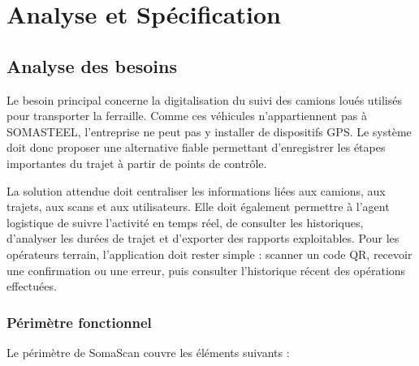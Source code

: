 \chapter{Analyse et Spécification}



\section{Analyse des besoins}

Le besoin principal concerne la digitalisation du suivi des camions loués utilisés pour transporter la ferraille. Comme ces véhicules n'appartiennent pas à SOMASTEEL, l'entreprise ne peut pas y installer de dispositifs GPS. Le système doit donc proposer une alternative fiable permettant d'enregistrer les étapes importantes du trajet à partir de points de contrôle.

La solution attendue doit centraliser les informations liées aux camions, aux trajets, aux scans et aux utilisateurs. Elle doit également permettre à l'agent logistique de suivre l'activité en temps réel, de consulter les historiques, d'analyser les durées de trajet et d'exporter des rapports exploitables. Pour les opérateurs terrain, l'application doit rester simple : scanner un code QR, recevoir une confirmation ou une erreur, puis consulter l'historique récent des opérations effectuées.

\subsection{Périmètre fonctionnel}

Le périmètre de SomaScan couvre les éléments suivants :

